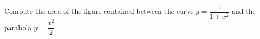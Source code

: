 
%
%
%
%
% 
% 

\question[3] Compute the area of the figure contained between the curve 
$y = \dfrac{1}{1+x^2}$ and the parabola $y=\dfrac{x^2}{2}$


